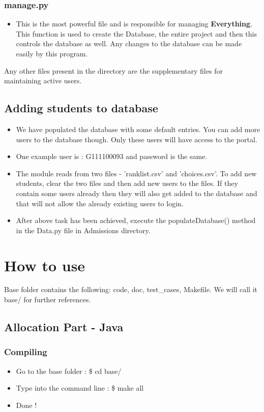 \documentclass[]{report}
\begin{document}
\subsection{manage.py}
\begin{itemize}
\item This is the most powerful file and is responsible for managing \textbf{Everything}. This function is used to create the Database, the entire project and then this controls the database as well. Any changes to the database can be made easily by this program.
\end{itemize}
Any other files present in the directory are the supplementary files for maintaining active users.
\section{Adding students to database}
\begin{itemize}
\item We have populated the database with some default entries. You can add more users to the database though. Only these users will have access to the portal.
\item One example user is : G111100093 and password is the same.
\item The module reads from two files - 'ranklist.csv' and 'choices.csv'. To add new students, clear the two files and then add new users to the files. If they contain some users already then they will also get added to the database and that will not allow the already existing users to login.
\item After above task has been achieved, execute the populateDatabase() method in the Data.py file in Admissions directory.
\end{itemize}


\chapter{How to use}
Base folder contains the following: code, doc, test\_cases, Makefile. We will call it base/ for further references.

\section{Allocation Part - Java}
\subsection{Compiling}
\begin{itemize}
\item Go to the base folder : \$ cd base/
\item Type into the command line : \$ make all
\item Done ! 
\end{itemize}
\end{document}
